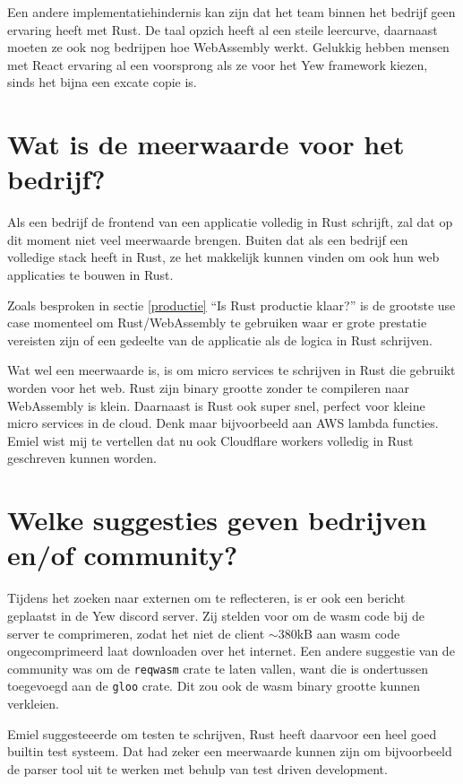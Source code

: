 Een andere implementatiehindernis kan zijn dat het team binnen het bedrijf geen ervaring heeft met
Rust. De taal opzich heeft al een steile leercurve, daarnaast moeten ze ook nog bedrijpen hoe
WebAssembly werkt. Gelukkig hebben mensen met React ervaring al een voorsprong als ze voor het Yew
framework kiezen, sinds het bijna een excate copie is.

\section{Wat is de meerwaarde voor het bedrijf?}

Als een bedrijf de frontend van een applicatie volledig in Rust schrijft, zal dat op dit moment niet
veel meerwaarde brengen. Buiten dat als een bedrijf een volledige stack heeft in Rust, ze het
makkelijk kunnen vinden om ook hun web applicaties te bouwen in Rust. 

Zoals besproken in sectie \ref{productie} \enquote{Is Rust productie klaar?} is de grootste use case
momenteel om Rust/WebAssembly te gebruiken waar er grote prestatie vereisten zijn of een gedeelte van
de applicatie als de logica in Rust schrijven.

Wat wel een meerwaarde is, is om micro services te schrijven in Rust die gebruikt worden voor het
web. Rust zijn binary grootte zonder te compileren naar WebAssembly is klein. Daarnaast is Rust ook
super snel, perfect voor kleine micro services in de cloud. Denk maar bijvoorbeeld aan AWS lambda
functies. Emiel wist mij te vertellen dat nu ook Cloudflare workers volledig in Rust geschreven
kunnen worden. \cite{cloudflare_workers}

\section{Welke suggesties geven bedrijven en/of community?}

Tijdens het zoeken naar externen om te reflecteren, is er ook een bericht geplaatst in de Yew
discord server. Zij stelden voor om de wasm code bij de server te comprimeren, zodat het niet de
client $\sim$380kB aan wasm code ongecomprimeerd laat downloaden over het internet. Een andere suggestie
van de community was om de \texttt{reqwasm} crate te laten vallen, want die is ondertussen
toegevoegd aan de \texttt{gloo} crate. Dit zou ook de wasm binary grootte kunnen
verkleien.

Emiel suggesteeerde om testen te schrijven, Rust heeft daarvoor een heel goed builtin test systeem.
Dat had zeker een meerwaarde kunnen zijn om bijvoorbeeld de parser tool uit te werken met behulp van
test driven development.

